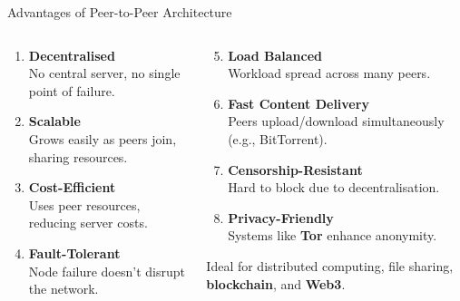 \documentclass[aspectratio=169, table]{beamer}
\begin{document}
\begin{frame}{Advantages of Peer-to-Peer Architecture}
	\vspace{20pt}
	\begin{columns}[t]
		
		\begin{column}{0.5\textwidth}
			\begin{enumerate}
				\item \textbf{Decentralised} \\
				No central server, no single point of failure.
				
				\item \textbf{Scalable} \\
				Grows easily as peers join, sharing resources.
				
				\item \textbf{Cost-Efficient} \\
				Uses peer resources, reducing server costs.
				
				\item \textbf{Fault-Tolerant} \\
				Node failure doesn’t disrupt the network.
			\end{enumerate}
		\end{column}
		
		\begin{column}{0.5\textwidth}
			\begin{enumerate}
				\setcounter{enumi}{4}
				\item \textbf{Load Balanced} \\
				Workload spread across many peers.
				
				\item \textbf{Fast Content Delivery} \\
				Peers upload/download simultaneously (e.g., BitTorrent).
				
				\item \textbf{Censorship-Resistant} \\
				Hard to block due to decentralisation.
				
				\item \textbf{Privacy-Friendly} \\
				Systems like \textbf{Tor} enhance anonymity.
			\end{enumerate}
		\vspace{10pt}
			Ideal for distributed computing, file sharing, \textbf{blockchain}, and \textbf{Web3}.
		\end{column}
		
	\end{columns}

\end{frame}
\end{document}
